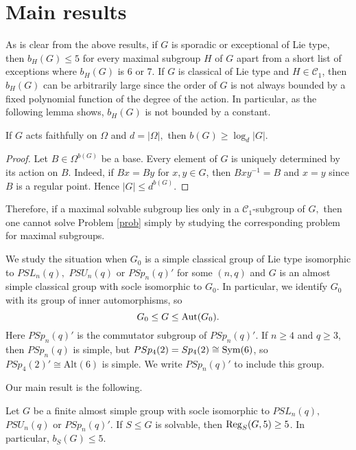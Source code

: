 \section{Main results}

As is clear from the above results, if $G$ is sporadic or exceptional of Lie type, then $b_H(G) \le 5$ for every maximal subgroup $H$ of $G$ apart from a short list of exceptions where  $b_H(G)$ is 6 or 7. If $G$ is classical of Lie type and $H \in \mathcal{C}_1$, then $b_H(G)$ can be arbitrarily large since the order
of $G$ is not always bounded by a fixed polynomial function of the degree of the action.  In particular, as the following lemma shows, $b_H(G)$ is not bounded by a constant.
\begin{Lem}
If $G$ acts faithfully on $\Omega$ and $d=|\Omega|,$ then $b(G) \ge \log_d|G|$.
\end{Lem}
\begin{proof}
Let $B \in \Omega^{b(G)}$ be a base. Every element of $G$ is uniquely determined by its action on $B$. Indeed, if $Bx=By$ for $x,y \in G$, then $Bxy^{-1}=B$ and $x=y$ since $B$ is a regular point. Hence $|G|\le d^{b(G)}.$ 
\end{proof}
    Therefore,  if a maximal solvable subgroup lies only in a $\mathcal{C}_1$-subgroup of $G,$ then one cannot solve Problem \ref{prob} simply by studying the corresponding problem for maximal subgroups.  


We study the situation when $G_0$ is a simple classical group of Lie type isomorphic to $PSL_n(q),$ $PSU_n(q)$ or $PSp_n(q)'$ for some $(n,q)$ and $G$ is an almost simple classical group with  socle isomorphic to $G_0.$ In particular, we identify $G_0$ with its group of  inner automorphisms, so 
$$G_0 \le G \le \mathrm{Aut} (G_0).$$ 
Here $PSp_n(q)'$ is the commutator subgroup of $PSp_n(q)'.$ If $n \ge 4$ and $q \ge 3$, then $PSp_n(q)$ is simple, but $PSp_4(2)=Sp_4(2) \cong \mathrm{Sym}(6)$, so  $PSp_4(2)' \cong \mathrm{Alt}(6)$ is simple. We write $PSp_n(q)'$ to include this group.

Our main result is the following.
\begin{mmainth}
\label{fulltheorem}
Let $G$ be a finite almost simple group with socle isomorphic to $PSL_n(q),$ $PSU_n(q)$ or $PSp_n(q)'.$ If $S \le G$ is solvable, then $\mathrm{Reg}_S(G,5) \ge 5$. In particular, $b_S(G) \le 5.$   
\end{mmainth}


